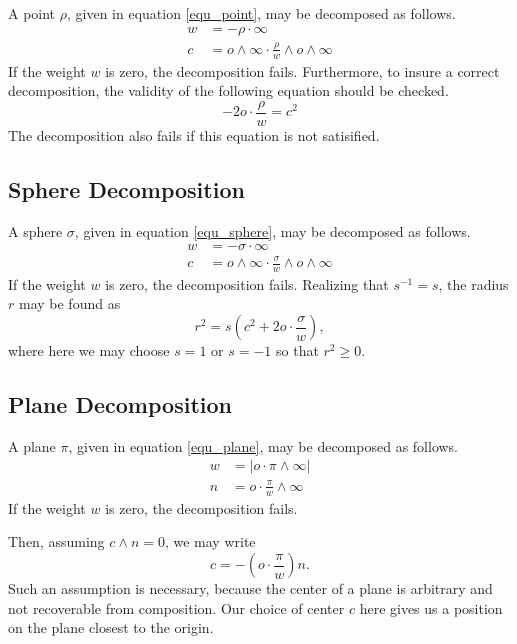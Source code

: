 \documentclass[12pt]{article}
\newcommand{\nvao}{o}
\newcommand{\nvai}{\infty}
\begin{document}
A point $\rho$, given in equation \eqref{equ_point}, may be decomposed as follows.
\begin{align}
w &= -\rho\cdot\nvai \\
c &= \nvao\wedge\nvai\cdot\frac{\rho}{w}\wedge\nvao\wedge\nvai
\end{align}
If the weight $w$ is zero, the decomposition fails.
Furthermore, to insure a correct decomposition, the validity of the following equation should be checked.
\begin{equation}
-2\nvao\cdot\frac{\rho}{w}=c^2
\end{equation}
The decomposition also fails if this equation is not satisified.

\subsection{Sphere Decomposition}

A sphere $\sigma$, given in equation \eqref{equ_sphere}, may be decomposed as follows.
\begin{align}
w &= -\sigma\cdot\nvai \\
c &= \nvao\wedge\nvai\cdot\frac{\sigma}{w}\wedge\nvao\wedge\nvai
\end{align}
If the weight $w$ is zero, the decomposition fails.
Realizing that $s^{-1}=s$, the radius $r$ may be found as
\begin{equation}
r^2 = s\left(c^2+2\nvao\cdot\frac{\sigma}{w}\right),
\end{equation}
where here we may choose $s=1$ or $s=-1$ so that $r^2\geq 0$.

\subsection{Plane Decomposition}

A plane $\pi$, given in equation \eqref{equ_plane}, may be decomposed as follows.
\begin{align}
w &= |\nvao\cdot\pi\wedge\nvai| \\
n &= \nvao\cdot\frac{\pi}{w}\wedge\nvai
\end{align}
If the weight $w$ is zero, the decomposition fails.

Then, assuming $c\wedge n=0$, we may write
\begin{equation}
c=-\left(\nvao\cdot\frac{\pi}{w}\right)n.
\end{equation}
Such an assumption is necessary, because the center of a plane is arbitrary
and not recoverable from composition.  Our choice of center $c$ here
gives us a position on the plane closest to the origin.
\end{document}
